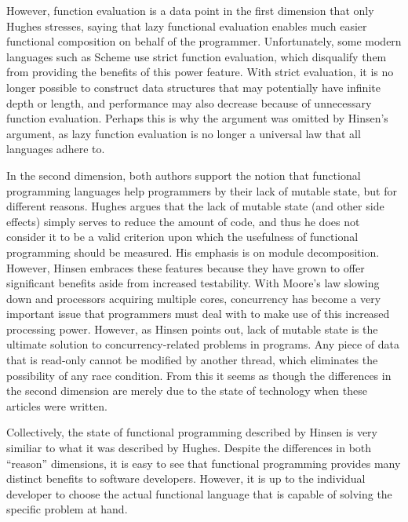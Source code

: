 \documentclass[12pt,letterpaper]{article}
\begin{document}
However, function evaluation is a data point in the first dimension that only Hughes stresses, saying that lazy functional
evaluation enables much easier functional composition on behalf of the programmer. Unfortunately, some modern
languages such as Scheme use strict function evaluation, which disqualify them from providing the benefits
of this power feature. With strict evaluation, it is no longer possible to construct data structures that may potentially
have infinite depth or length, and performance may also decrease because of unnecessary function evaluation. 
Perhaps this is why the argument was omitted by Hinsen's argument, as lazy function evaluation is no longer a universal
law that all languages adhere to. 

In the second dimension, both authors support the notion that functional programming languages help programmers
by their lack of mutable state, but for different reasons. Hughes argues that the lack of mutable state (and other side effects)
simply serves to reduce the amount of code, and thus he does not consider it to be a valid criterion upon which 
the usefulness of functional programming should be measured. His emphasis is on module decomposition.
However, Hinsen embraces these features because they have grown to offer significant benefits aside from increased
testability. With Moore's law slowing down and processors acquiring multiple cores, concurrency has become a
very important issue that programmers must deal with to make use of this increased processing power. However,
as Hinsen points out, lack of mutable state is the ultimate solution to concurrency-related problems in programs. 
Any piece of data that is read-only cannot be modified by another thread, which eliminates the possibility of 
any race condition. From this it seems as though the differences in the second dimension are merely due to the state of
technology when these articles were written. 

Collectively, the state of functional programming described by Hinsen is very similiar to what it was described by
Hughes. Despite the differences in both ``reason'' dimensions, it is easy to see that functional programming 
provides many distinct benefits to software developers. However, it is up to the individual developer to choose
the actual functional language that is capable of solving the specific problem at hand. 



\end{document}
